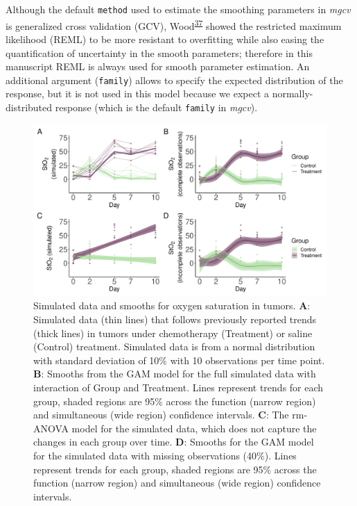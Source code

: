 \documentclass[
]{article}
\newcommand{\passthrough}[1]{#1}
\begin{document}
Although the default \passthrough{\lstinline!method!} used to estimate the smoothing parameters in \emph{mgcv} is generalized cross validation (GCV), Wood\textsuperscript{\protect\hyperlink{ref-wood2017}{37}} showed the restricted maximum likelihood (REML) to be more resistant to overfitting while also easing the quantification of uncertainty in the smooth parameters; therefore in this manuscript REML is always used for smooth parameter estimation. An additional argument (\passthrough{\lstinline!family!}) allows to specify the expected distribution of the response, but it is not used in this model because we expect a normally-distributed response (which is the default \passthrough{\lstinline!family!} in \emph{mgcv}).



\begin{figure}

{\centering \includegraphics[width=1\linewidth]{Full_document_SIM_No_Appendix_files/figure-latex/sim-smooth-plot-1} 

}

\caption{Simulated data and smooths for oxygen saturation in tumors. \textbf{A}: Simulated data (thin lines) that follows previously reported trends (thick lines) in tumors under chemotherapy (Treatment) or saline (Control) treatment. Simulated data is from a normal distribution with standard deviation of 10\% with 10 observations per time point. \textbf{B}: Smooths from the GAM model for the full simulated data with interaction of Group and Treatment. Lines represent trends for each group, shaded regions are 95\% across the function (narrow region) and simultaneous (wide region) confidence intervals. \textbf{C}: The rm-ANOVA model for the simulated data, which does not capture the changes in each group over time. \textbf{D}: Smooths for the GAM model for the simulated data with missing observations (40\%). Lines represent trends for each group, shaded regions are 95\% across the function (narrow region) and simultaneous (wide region) confidence intervals.}\label{fig:sim-smooth-plot}
\end{figure}
\end{document}
